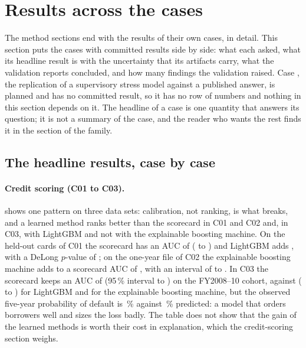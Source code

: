 \section{Results across the cases}
\label{sec:results}

The method sections end with the results of their own cases, in detail. This section puts the \rsCasesResult{} cases with committed results side by side: what each asked, what its headline result is with the uncertainty
that its artifacts carry, what the validation reports concluded, and how many findings the validation raised. Case \rsCaseNoResult{}, the replication of a supervisory stress model against a published answer, is planned and has no committed result, so it has no
row of numbers and nothing in this section depends on it. The headline of a case is one quantity that answers its question; it is not a summary of the case, and the reader who wants the rest finds it in the section of the family.



\subsection{The headline results, case by case}
\label{sec:results-headlines}

\paragraph{Credit scoring (C01 to C03).}  shows one pattern on three data sets: calibration, not ranking, is what breaks, and a learned method ranks better than the scorecard in C01 and C02 and, in C03, with LightGBM and not with the explainable boosting machine. On the \csHoN{} held-out cards of C01 the scorecard has an AUC of \csHoScAuc{} (\csHoScAucLo{} to \csHoScAucHi{}) and LightGBM adds \csHoLgDlDiff{}, with a DeLong $p$-value of \csHoLgDlP{}; on the one-year file of C02 the explainable boosting machine adds \csCtwoAEbDiff{} to a scorecard AUC of \csCtwoAScAuc{}, with an interval of \csCtwoAEbDiffLo{} to \csCtwoAEbDiffHi{}. In C03 the scorecard keeps an AUC of \rsCThreeAuc{} (95\,\% interval \rsCThreeAucLo{} to \rsCThreeAucHi{}) on the FY2008--10 cohort, against \rsCThreeLgbAuc{} (\rsCThreeLgbLo{} to \rsCThreeLgbHi{}) for LightGBM and \rsCThreeEbmAuc{} for the explainable boosting machine, but the observed five-year probability of default is \rsCThreeObs{}\,\% against \rsCThreePred{}\,\% predicted: a model that orders borrowers well and sizes the loss badly. The table does not show that the gain of the learned methods is worth their cost in explanation, which the credit-scoring section weighs.

